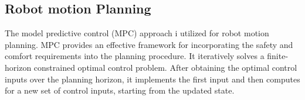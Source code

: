 \documentclass[letterpaper, 10 pt, conference]{ieeeconf}
\newcommand{\todonote}[1]{\vspace{0px} %
	\todo[inline, color=green!30]{\textbf{[Note:]} {#1}} %
}
\begin{document}
	\subsection{Robot motion Planning}\label{subsec:robot_path_plan}
	The model predictive control (MPC) approach i utilized for robot motion planning.
	MPC provides an effective framework for incorporating the safety and comfort requirements into the planning procedure.
	It iteratively solves a finite-horizon constrained optimal control problem.
	After obtaining the optimal control inputs over the planning horizon, it implements the first input and then computes for a new set of control inputs, starting from the updated state.
\end{document}
